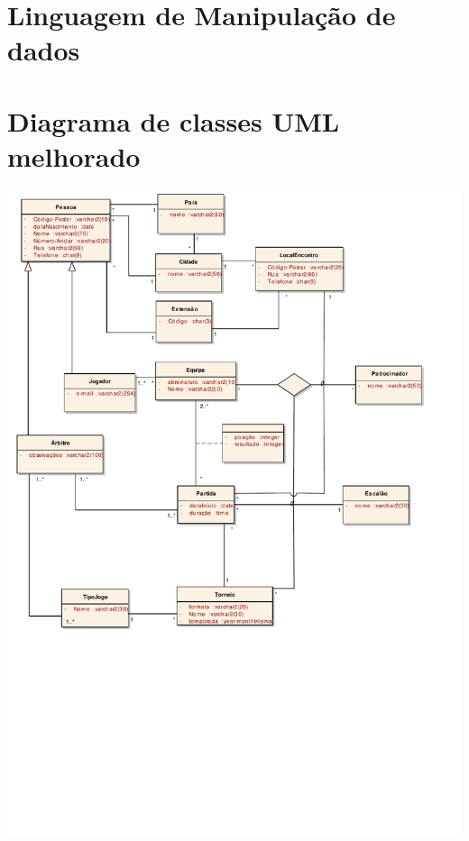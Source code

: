 \documentclass[a4paper]{article}
\begin{document}
\section{Linguagem de Manipulação de dados}

\section{Diagrama de classes UML melhorado}
\includegraphics[scale=0.6]{./classModel.pdf}
\end{document}
